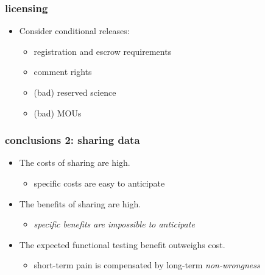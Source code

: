 \documentclass[pdftex]{beamer}
\begin{document}
\begin{frame}
  \frametitle{licensing}
  \begin{itemize}
  \item Consider conditional releases:
    \begin{itemize}
    \item registration and escrow requirements
    \item comment rights
    \item (bad) reserved science
    \item (bad) MOUs
    \end{itemize}
  \end{itemize}
\end{frame}

\begin{frame}
  \frametitle{conclusions 2: sharing data}
  \begin{itemize}
  \item The costs of sharing are high.
    \begin{itemize}
    \item specific costs are easy to anticipate
    \end{itemize}
  \item The benefits of sharing are high.
    \begin{itemize}
    \item \emph{specific benefits are impossible to anticipate}
    \end{itemize}
  \item The expected functional testing benefit outweighs cost.
    \begin{itemize}
    \item short-term pain is compensated by long-term \emph{non-wrongness}
    \end{itemize}
  \end{itemize}
\end{frame}
\end{document}
